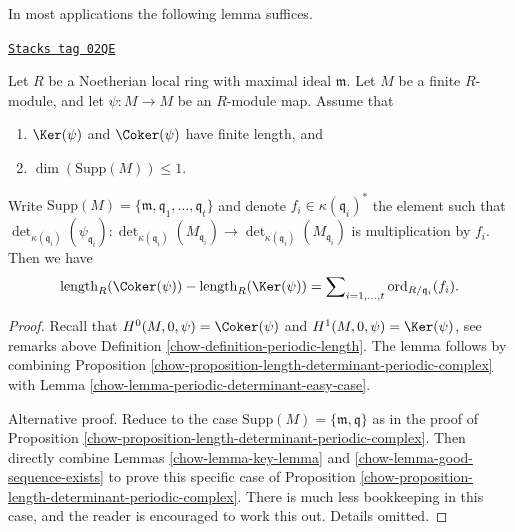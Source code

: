 In most applications the following lemma suffices.

\begin{lemma}
\label{chow-lemma-application-herbrand-quotient}
\href{https://stacks.math.columbia.edu/tag/02QE}{\texttt{Stacks tag 02QE}}

Let $R$ be a Noetherian local ring with maximal ideal $\mathfrak m$.
Let $M$ be a finite $R$-module, and let $\psi : M \to M$ be an
$R$-module map. Assume that
\begin{enumerate}
\item $\Ker(\psi)$ and $\Coker(\psi)$ have finite length, and
\item $\dim(\text{Supp}(M)) \leq 1$.
\end{enumerate}
Write
$\text{Supp}(M) = \{\mathfrak m, \mathfrak q_1, \ldots, \mathfrak q_t\}$
and denote $f_i \in \kappa(\mathfrak q_i)^*$ the element such that
$\det_{\kappa(\mathfrak q_i)}(\psi_{\mathfrak q_i}) :
\det_{\kappa(\mathfrak q_i)}(M_{\mathfrak q_i})
\to \det_{\kappa(\mathfrak q_i)}(M_{\mathfrak q_i})$
is multiplication by $f_i$. Then
we have
$$
\text{length}_R(\Coker(\psi))
-
\text{length}_R(\Ker(\psi))
=
\sum\nolimits_{i = 1, \ldots, t}
\text{ord}_{R/\mathfrak q_i}(f_i).
$$
\end{lemma}

\begin{proof}

Recall that $H^0(M, 0, \psi) = \Coker(\psi)$ and
$H^1(M, 0, \psi) = \Ker(\psi)$, see remarks above
Definition \ref{chow-definition-periodic-length}.
The lemma follows by combining
Proposition \ref{chow-proposition-length-determinant-periodic-complex} with
Lemma \ref{chow-lemma-periodic-determinant-easy-case}.

\medskip\noindent
Alternative proof. Reduce to the case
$\text{Supp}(M) = \{\mathfrak m, \mathfrak q\}$
as in the proof of
Proposition \ref{chow-proposition-length-determinant-periodic-complex}.
Then directly combine
Lemmas \ref{chow-lemma-key-lemma} and
\ref{chow-lemma-good-sequence-exists}
to prove this specific case of
Proposition \ref{chow-proposition-length-determinant-periodic-complex}.
There is much less bookkeeping in this case, and the reader is
encouraged to work this out. Details omitted.
\end{proof}


